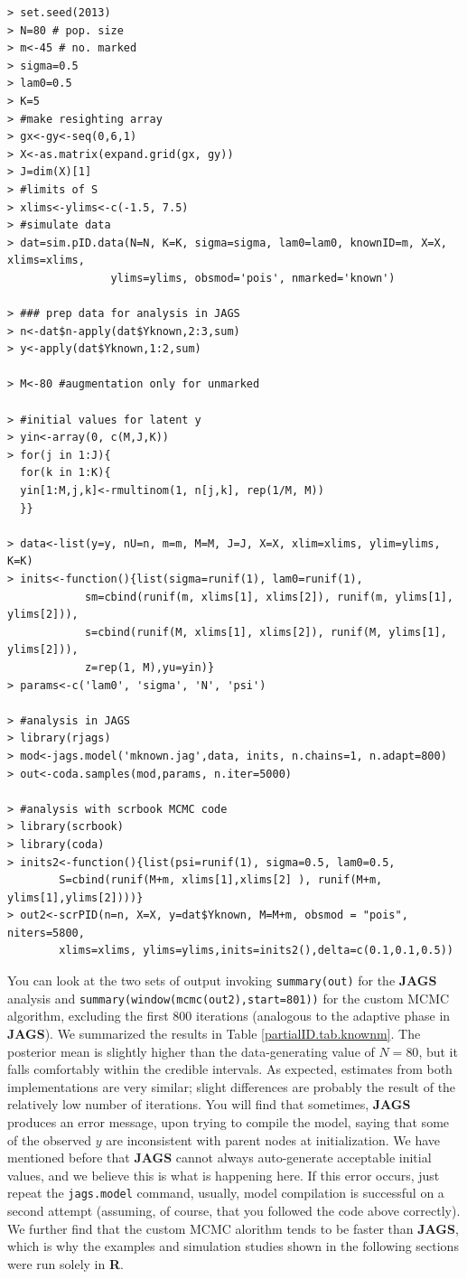 {\small
\begin{verbatim}
> set.seed(2013)
> N=80 # pop. size
> m<-45 # no. marked
> sigma=0.5
> lam0=0.5
> K=5
> #make resighting array
> gx<-gy<-seq(0,6,1)
> X<-as.matrix(expand.grid(gx, gy))
> J=dim(X)[1]
> #limits of S
> xlims<-ylims<-c(-1.5, 7.5)
> #simulate data
> dat=sim.pID.data(N=N, K=K, sigma=sigma, lam0=lam0, knownID=m, X=X, xlims=xlims, 
				ylims=ylims, obsmod='pois',	nmarked='known')

> ### prep data for analysis in JAGS
> n<-dat$n-apply(dat$Yknown,2:3,sum)
> y<-apply(dat$Yknown,1:2,sum)

> M<-80 #augmentation only for unmarked

> #initial values for latent y
> yin<-array(0, c(M,J,K))
> for(j in 1:J){
  for(k in 1:K){
  yin[1:M,j,k]<-rmultinom(1, n[j,k], rep(1/M, M))
  }}

> data<-list(y=y, nU=n, m=m, M=M, J=J, X=X, xlim=xlims, ylim=ylims, K=K)
> inits<-function(){list(sigma=runif(1), lam0=runif(1), 
			sm=cbind(runif(m, xlims[1], xlims[2]), runif(m, ylims[1], ylims[2])),
			s=cbind(runif(M, xlims[1], xlims[2]), runif(M, ylims[1], ylims[2])),
			z=rep(1, M),yu=yin)}
> params<-c('lam0', 'sigma', 'N', 'psi')

> #analysis in JAGS
> library(rjags)
> mod<-jags.model('mknown.jag',data, inits, n.chains=1, n.adapt=800)
> out<-coda.samples(mod,params, n.iter=5000)

> #analysis with scrbook MCMC code
> library(scrbook)
> library(coda)
> inits2<-function(){list(psi=runif(1), sigma=0.5, lam0=0.5, 
		S=cbind(runif(M+m, xlims[1],xlims[2] ), runif(M+m, ylims[1],ylims[2])))}
> out2<-scrPID(n=n, X=X, y=dat$Yknown, M=M+m, obsmod = "pois", niters=5800, 
		xlims=xlims, ylims=ylims,inits=inits2(),delta=c(0.1,0.1,0.5))
\end{verbatim}
}
You can look at the two sets of output invoking {\tt summary(out)} for the {\bf JAGS} analysis and {\tt summary(window(mcmc(out2),start=801))} for the custom MCMC algorithm, excluding the first 800 iterations (analogous to the adaptive phase in {\bf JAGS}). We summarized the results in Table \ref{partialID.tab.knownm}.
The posterior mean is slightly higher than the data-generating value of $N=80$, but it falls comfortably within the credible intervals. %
As expected, estimates from both implementations are very similar; slight differences are probably the result of the relatively low number of iterations.
You will find that sometimes, {\bf JAGS} produces an error message, upon trying to compile the model, saying that some of the observed $y$ are inconsistent with parent nodes at initialization. We have mentioned before that  {\bf JAGS} cannot always auto-generate acceptable %
initial values, and we believe this is what is happening here. If this error occurs, just repeat the {\tt jags.model} command, usually, model compilation is successful on a second attempt (assuming, of course, that you followed the code above correctly). We further find that the custom MCMC alorithm tends to be faster than {\bf JAGS}, which is why the examples and simulation studies shown in the following sections were run solely in {\bf R}.

